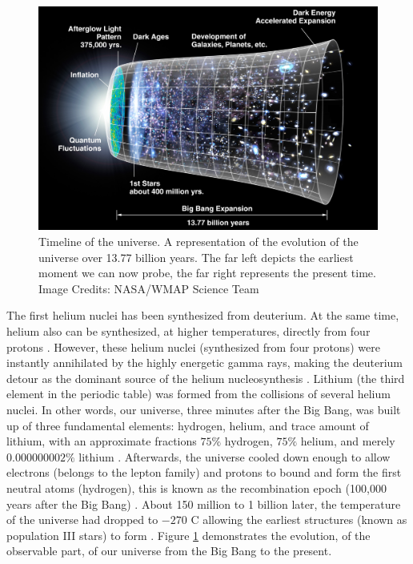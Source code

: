 \begin{figure}[!ht]
\centering
\includegraphics[width=\textwidth, angle=0]{Img/timescale.jpg}
\caption{Timeline of the universe. A representation of the evolution of the universe over 13.77 billion years. The far left depicts the earliest moment we can now probe, the far right represents the present time. Image Credits: NASA/WMAP Science Team}
\label{fig:timescale}
\end{figure}


The first helium nuclei has been synthesized from deuterium. At the same time, helium also can be synthesized, at higher temperatures, directly from four protons \citep{2000JRASC..94..198M,2000PhR...333..433P}. However, these helium nuclei (synthesized from four protons) were instantly annihilated by the highly energetic gamma rays, making the deuterium detour as the dominant source of the helium nucleosynthesis \citep{1969PhDT........85G,1969FMSp...12..111G,1979A&A....80...71A}. Lithium (the third ele­ment in the periodic table) was formed from the collisions of several helium nuclei. In other words, our universe, three minutes after the Big Bang, was built up of three fundamental el­ements: hydrogen, helium, and trace amount of lithium, with an approximate fractions $75 \%$ hydrogen, $75 \%$ helium, and merely $0.000000002 \%$ lithium \citep{1990BAAS...22.1214D, 2000INGN....3...14R,2000eaa..bookE4801.}. Afterwards, the universe cooled down enough to allow electrons (belongs to the lepton family) and protons to bound and form the first neutral atoms (hydrogen), this is known as the recombination epoch (100,000 years after the Big Bang) \citep{1991STIN...9211944D,1994PhDT.......131T,1996A&A...305..371P,2000fist.conf..229G}. About 150 million to 1 billion later, the temperature of the universe had dropped to $-270$ \textdegree{}C allowing the earliest structures (known as population III stars) to form \citep{1981ApJ...248..606B,1982ASIC...90..293O,1983Natur.304..514B,1983tasa.conf..108A,1984ASIC..117..253S,2000A&A...356..873A}. Figure \ref{fig:timescale} demonstrates the evolution, of the observable part, of our universe from the Big Bang to the present.



